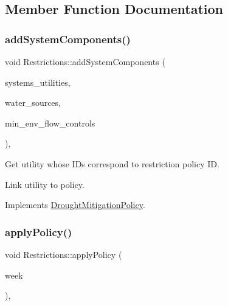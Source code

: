 \subsection{Member Function Documentation}
\mbox{\label{classRestrictions_ab0a2b62495d6cdd8d1fedba419c05c37}} 
\subsubsection{\texorpdfstring{add\+System\+Components()}{addSystemComponents()}}
{\footnotesize\ttfamily void Restrictions\+::add\+System\+Components (\begin{DoxyParamCaption}\item[{vector$<$ \mbox{\hyperlink{classUtility}{Utility}} $\ast$$>$}]{systems\+\_\+utilities,  }\item[{vector$<$ \mbox{\hyperlink{classWaterSource}{Water\+Source}} $\ast$$>$}]{water\+\_\+sources,  }\item[{vector$<$ \mbox{\hyperlink{classMinEnvFlowControl}{Min\+Env\+Flow\+Control}} $\ast$$>$}]{min\+\_\+env\+\_\+flow\+\_\+controls }\end{DoxyParamCaption})\hspace{0.3cm}{\ttfamily [override]}, {\ttfamily [virtual]}}

Get utility whose I\+Ds correspond to restriction policy ID.

Link utility to policy. 

Implements \mbox{\hyperlink{classDroughtMitigationPolicy_aaab042a79d781afe8e08753b7012372a}{Drought\+Mitigation\+Policy}}.

\mbox{\label{classRestrictions_a1ef7559adc034bdddd047ee776b5f9a9}} 
\subsubsection{\texorpdfstring{apply\+Policy()}{applyPolicy()}}
{\footnotesize\ttfamily void Restrictions\+::apply\+Policy (\begin{DoxyParamCaption}\item[{int}]{week }\end{DoxyParamCaption})\hspace{0.3cm}{\ttfamily [override]}, {\ttfamily [virtual]}}


